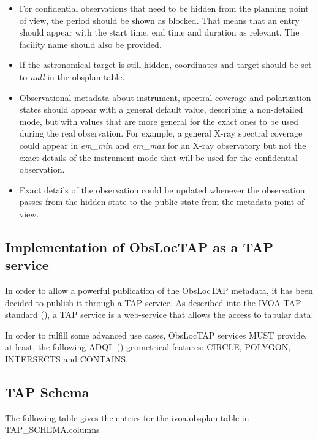 \documentclass[11pt,a4paper]{ivoa}
\begin{document}
\begin{itemize}
	\item For confidential observations that need to be hidden from the planning point of view, the period should be shown as blocked. That means that an entry should appear with the start time, end time and duration as relevant. The facility name should also be provided.

	\item If the astronomical target is still hidden, coordinates and target should be set to \textit{null} in the obsplan table.

	\item Observational metadata about instrument, spectral coverage and polarization states should appear with a general default value, describing a non-detailed mode, but with values that are more general for the exact ones to be used during the real observation. For example, a general X-ray spectral coverage could appear in \textit{em\_min} and \textit{em\_max} for an X-ray observatory but not the exact details of the instrument mode that will be used for the confidential observation.

	\item Exact details of the observation could be updated whenever the observation passes from the hidden state to the public state from the metadata point of view.
\end{itemize}

\subsection{Implementation of ObsLocTAP as a TAP service}
In order to allow a powerful publication of the ObsLocTAP metadata, it has been decided to publish it through a TAP service. As described into the IVOA TAP standard (\cite{Pat10}), a TAP service is a web-service that allows the access to tabular data.\par

In order to fulfill some advanced use cases, ObsLocTAP services MUST provide, at least, the following ADQL (\cite{Ina08}) geometrical features: CIRCLE, POLYGON, INTERSECTS and CONTAINS.\par

\subsection{TAP Schema}
The following table gives the entries for the ivoa.obsplan table in TAP\_SCHEMA.columns
\end{document}
